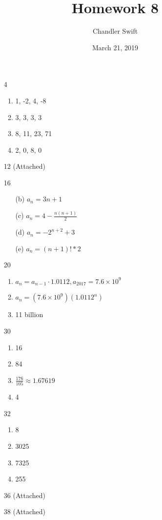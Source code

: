 \documentclass{article}
\title{Homework 8}
\author{Chandler Swift}
\date{March 21, 2019}
\begin{document}
\maketitle
\begin{enumerate}
  \item[4]
    \begin{enumerate}
      \item 1, -2, 4, -8
      \item 3, 3, 3, 3
      \item 8, 11, 23, 71
      \item 2, 0, 8, 0
    \end{enumerate}
  \item[12] (Attached)
  \item[16]
    \begin{enumerate}
      \item[(b)] $a_n=3n+1$
      \item[(c)] $a_n=4-\frac{n(n+1)}{2}$
      \item[(d)] $a_n=-2^{n+2}+3$
      \item[(e)] $a_n=(n+1)! * 2$
    \end{enumerate}
  \item[20]
    \begin{enumerate}
      \item $a_n=a_{n-1} \cdot 1.0112,a_{2017}=7.6\times10^9$
      \item $a_n=(7.6\times10^9)(1.0112^n)$
      \item 11 billion
    \end{enumerate}
  \item[30]
    \begin{enumerate}
      \item 16
      \item 84
      \item $\frac{176}{105} \approx 1.67619$
      \item 4
    \end{enumerate}
  \item[32]
    \begin{enumerate}
      \item 8
      \item 3025
      \item 7325
      \item 255
    \end{enumerate}
  \item[36] (Attached)
  \item[38] (Attached)
\end{enumerate}
\end{document}
